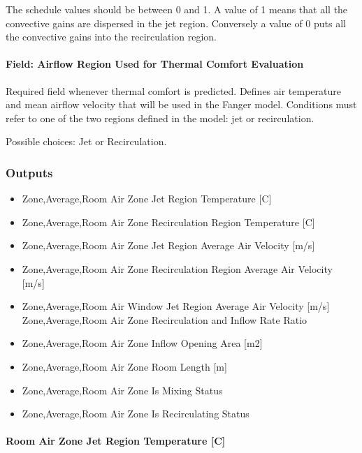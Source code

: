 The schedule values should be between 0 and 1. A value of 1 means that all the convective gains are dispersed in the jet region. Conversely a value of 0 puts all the convective gains into the recirculation region.

\paragraph{Field: Airflow Region Used for Thermal Comfort Evaluation}\label{field-airflow-region-used-for-thermal-comfort-evaluation}

Required field whenever thermal comfort is predicted. Defines air temperature and mean airflow velocity that will be used in the Fanger model. Conditions must refer to one of the two regions defined in the model: jet or recirculation.

Possible choices: Jet or Recirculation.

\subsubsection{Outputs}\label{outputs-030}

\begin{itemize}
\item
  Zone,Average,Room Air Zone Jet Region Temperature {[}C{]}
\item
  Zone,Average,Room Air Zone Recirculation Region Temperature {[}C{]}
\item
  Zone,Average,Room Air Zone Jet Region Average Air Velocity {[}m/s{]}
\item
  Zone,Average,Room Air Zone Recirculation Region Average Air Velocity {[}m/s{]}
\item
  Zone,Average,Room Air Window Jet Region Average Air Velocity {[}m/s{]} Zone,Average,Room Air Zone Recirculation and Inflow Rate Ratio \protect\hyperlink{section-1}{}
\item
  Zone,Average,Room Air Zone Inflow Opening Area {[}m2{]}
\item
  Zone,Average,Room Air Zone Room Length {[}m{]}
\item
  Zone,Average,Room Air Zone Is Mixing Status \protect\hyperlink{section-1}{}
\item
  Zone,Average,Room Air Zone Is Recirculating Status \protect\hyperlink{section-1}{}
\end{itemize}

\paragraph{Room Air Zone Jet Region Temperature {[}C{]}}\label{room-air-zone-jet-region-temperature-c}

